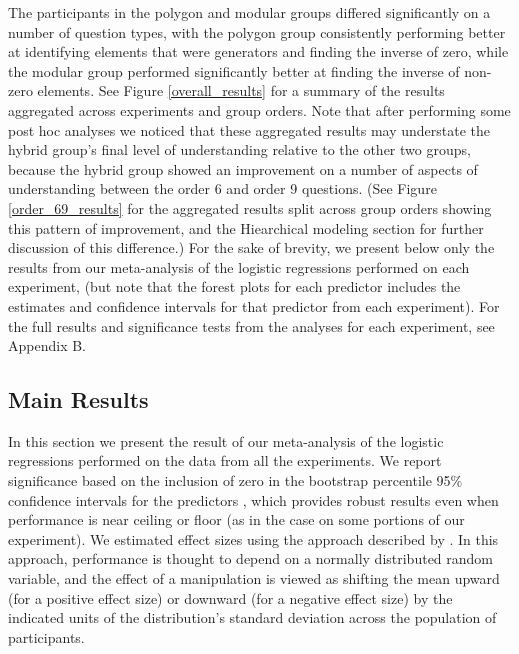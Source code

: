 \documentclass[man,10pt]{apa6}
\begin{document}
The participants in the polygon and modular groups differed significantly on a number of question types, with the polygon group consistently performing better at identifying elements that were generators and finding the inverse of zero, while the modular group performed significantly better at finding the inverse of non-zero elements. See Figure \ref{overall_results} for a summary of the results aggregated across experiments and group orders. Note that after performing some post hoc analyses we noticed that these aggregated results may understate the hybrid group's final level of understanding relative to the other two groups, because the hybrid group showed an improvement on a number of aspects of understanding between the order 6 and order 9 questions. (See Figure \ref{order_69_results} for the aggregated results split across group orders showing this pattern of improvement, and the Hiearchical modeling section for further discussion of this difference.) For the sake of brevity, we present below only the results from our meta-analysis of the logistic regressions performed on each experiment, (but note that the forest plots for each predictor includes the estimates and confidence intervals for that predictor from each experiment). For the full results and significance tests from the analyses for each experiment, see Appendix B.  
\subsection{Main Results}
In this section we present the result of our meta-analysis of the logistic regressions performed on the data from all the experiments. We report significance based on the inclusion of zero in the bootstrap percentile 95\% confidence intervals for the predictors \cite{Wasserman2006,Gong1986}, which provides robust results even when performance is near ceiling or floor (as in the case on some portions of our experiment). We estimated effect sizes using the approach described by . In this approach, performance is thought to depend on a normally distributed random variable, and the effect of a manipulation is viewed as shifting the mean upward (for a positive effect size) or downward (for a negative effect size) by the indicated units of the distribution's standard deviation across the population of participants.  
\end{document}
